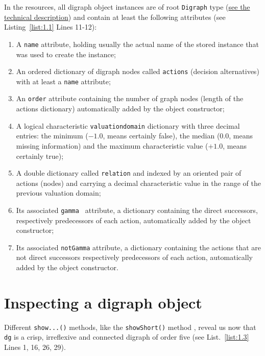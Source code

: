 In the \Digraph resources, all digraph object instances are of root \texttt{Digraph} type (\href{https://digraph3.readthedocs.io/en/latest/techDoc.html#organisation-of-the-digraph3-modules}{see the technical description}) and contain at least the following attributes (see Listing~\vref{list:1.1}  Lines 11-12):
\begin{enumerate}[leftmargin=0.5cm,listparindent=0em,nosep]
\item A \texttt{name} attribute, holding usually the actual name of the stored instance that was used to create the instance;
\item An ordered dictionary of digraph nodes called \texttt{actions} (decision alternatives) with at least a \texttt{name} attribute;
\item An \texttt{order} attribute containing the number of graph nodes (length of the actions dictionary) automatically added by the object constructor;
\item  A logical characteristic \texttt{valuationdomain} dictionary with three decimal entries: the minimum ($-1.0$, means certainly false), the median ($0.0$, means missing information) and the maximum characteristic value ($+1.0$, means certainly true);
\item A double dictionary called \texttt{relation} and indexed by an oriented pair of actions (nodes) and carrying a decimal characteristic value in the range of the previous valuation domain;
\item Its associated \texttt{gamma } attribute, a dictionary containing the direct successors, respectively predecessors of each action, automatically added by the object constructor;
\item Its associated \texttt{notGamma} attribute, a dictionary containing the actions that are not direct successors respectively predecessors of each action, automatically added by the object constructor.
\end{enumerate}

\section{Inspecting a digraph object}
\label{sec:1.4}

Different \texttt{show...()} methods, like the \texttt{showShort()} method , reveal us now that \texttt{dg} is a crisp, irreflexive and connected digraph of order five (see List.~\vref{list:1.3}  Lines 1, 16, 26, 29).

